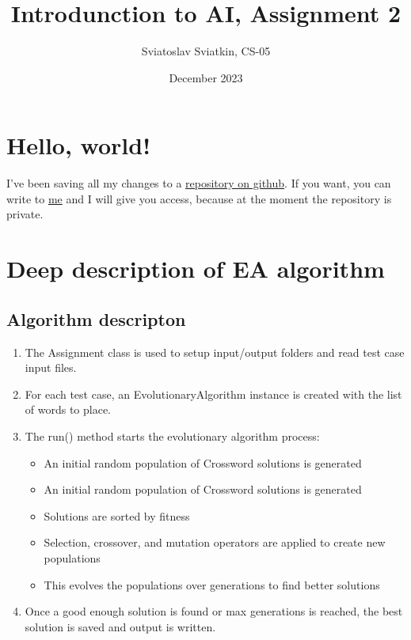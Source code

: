 \documentclass{article}
\title{Introdunction to AI, Assignment 2}
\author{Sviatoslav Sviatkin, CS-05}
\date{December 2023}
\begin{document}
\maketitle

\section*{Hello, world!}
I've been saving all my changes to a \href{https://github.com/dmhd6219/crossword-generation}{repository on github}. If you want, you can write to \href{https://t.me/slavasvyatkin}{me} and I will give you access, because at the moment the repository is private.

\section*{Deep description of EA algorithm}

\subsection*{Algorithm descripton}

\begin{enumerate}
	\item The Assignment class is used to setup input/output folders and read test case input files.
	\item For each test case, an EvolutionaryAlgorithm instance is created with the list of words to place.
	\item The run() method starts the evolutionary algorithm process:
		\begin{itemize}
				\item An initial random population of Crossword solutions is generated
				\item An initial random population of Crossword solutions is generated
				\item Solutions are sorted by fitness
				\item Selection, crossover, and mutation operators are applied to create new populations
				\item This evolves the populations over generations to find better solutions
		\end{itemize}
	\item Once a good enough solution is found or max generations is reached, the best solution is saved and output is written.

\end{enumerate}
\end{document}
